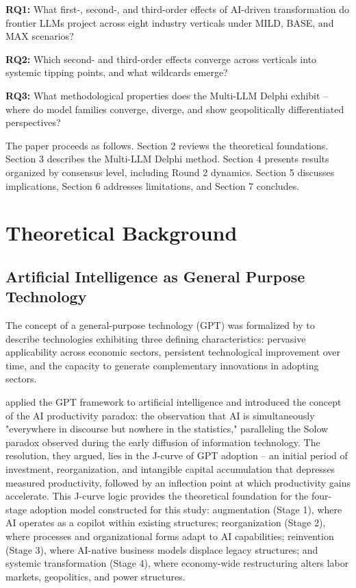 \documentclass[preprint,review,12pt]{elsarticle}
\begin{document}
\textbf{RQ1:} What first-, second-, and third-order effects of AI-driven transformation do frontier LLMs project across eight industry verticals under MILD, BASE, and MAX scenarios?

\textbf{RQ2:} Which second- and third-order effects converge across verticals into systemic tipping points, and what wildcards emerge?

\textbf{RQ3:} What methodological properties does the Multi-LLM Delphi exhibit -- where do model families converge, diverge, and show geopolitically differentiated perspectives?

The paper proceeds as follows. Section 2 reviews the theoretical foundations. Section 3 describes the Multi-LLM Delphi method. Section 4 presents results organized by consensus level, including Round 2 dynamics. Section 5 discusses implications, Section 6 addresses limitations, and Section 7 concludes.



\section{Theoretical Background}
\label{sec:theoretical_background}


\subsection{Artificial Intelligence as General Purpose Technology}
\label{sec:ai_as_gpt}

The concept of a general-purpose technology (GPT) was formalized by \citet{bresnahan1995gpt} to describe technologies exhibiting three defining characteristics: pervasive applicability across economic sectors, persistent technological improvement over time, and the capacity to generate complementary innovations in adopting sectors.

\citet{brynjolfsson2017productivity} applied the GPT framework to artificial intelligence and introduced the concept of the AI productivity paradox: the observation that AI is simultaneously "everywhere in discourse but nowhere in the statistics," paralleling the Solow paradox observed during the early diffusion of information technology. The resolution, they argued, lies in the J-curve of GPT adoption -- an initial period of investment, reorganization, and intangible capital accumulation that depresses measured productivity, followed by an inflection point at which productivity gains accelerate. This J-curve logic provides the theoretical foundation for the four-stage adoption model constructed for this study: augmentation (Stage 1), where AI operates as a copilot within existing structures; reorganization (Stage 2), where processes and organizational forms adapt to AI capabilities; reinvention (Stage 3), where AI-native business models displace legacy structures; and systemic transformation (Stage 4), where economy-wide restructuring alters labor markets, geopolitics, and power structures.
\end{document}
